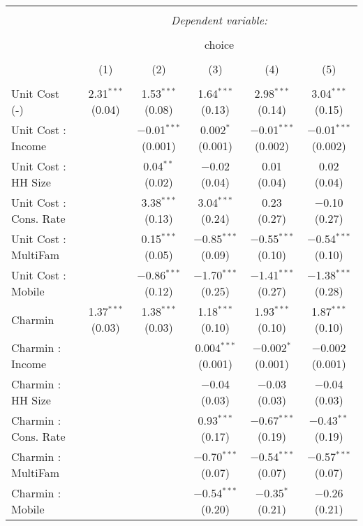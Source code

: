 
\begin{table}[!htbp] \centering 
  \caption{} 
  \label{tab:mnlBostonObsHet} 
\begin{tabular}{@{\extracolsep{5pt}}lccccc} 
\\[-1.8ex]\hline 
\hline \\[-1.8ex] 
 & \multicolumn{5}{c}{\textit{Dependent variable:}} \\ 
\cline{2-6} 
\\[-1.8ex] & \multicolumn{5}{c}{choice} \\ 
\\[-1.8ex] & (1) & (2) & (3) & (4) & (5)\\ 
\hline \\[-1.8ex] 
 Unit Cost (-) & 2.31$^{***}$ (0.04) & 1.53$^{***}$ (0.08) & 1.64$^{***}$ (0.13) & 2.98$^{***}$ (0.14) & 3.04$^{***}$ (0.15) \\ 
  Unit Cost : Income &  & $-$0.01$^{***}$ (0.001) & 0.002$^{*}$ (0.001) & $-$0.01$^{***}$ (0.002) & $-$0.01$^{***}$ (0.002) \\ 
  Unit Cost : HH Size &  & 0.04$^{**}$ (0.02) & $-$0.02 (0.04) & 0.01 (0.04) & 0.02 (0.04) \\ 
  Unit Cost : Cons. Rate &  & 3.38$^{***}$ (0.13) & 3.04$^{***}$ (0.24) & 0.23 (0.27) & $-$0.10 (0.27) \\ 
  Unit Cost : MultiFam &  & 0.15$^{***}$ (0.05) & $-$0.85$^{***}$ (0.09) & $-$0.55$^{***}$ (0.10) & $-$0.54$^{***}$ (0.10) \\ 
  Unit Cost : Mobile &  & $-$0.86$^{***}$ (0.12) & $-$1.70$^{***}$ (0.25) & $-$1.41$^{***}$ (0.27) & $-$1.38$^{***}$ (0.28) \\ 
  Charmin & 1.37$^{***}$ (0.03) & 1.38$^{***}$ (0.03) & 1.18$^{***}$ (0.10) & 1.93$^{***}$ (0.10) & 1.87$^{***}$ (0.10) \\ 
  Charmin : Income &  &  & 0.004$^{***}$ (0.001) & $-$0.002$^{*}$ (0.001) & $-$0.002 (0.001) \\ 
  Charmin : HH Size &  &  & $-$0.04 (0.03) & $-$0.03 (0.03) & $-$0.04 (0.03) \\ 
  Charmin : Cons. Rate &  &  & 0.93$^{***}$ (0.17) & $-$0.67$^{***}$ (0.19) & $-$0.43$^{**}$ (0.19) \\ 
  Charmin : MultiFam &  &  & $-$0.70$^{***}$ (0.07) & $-$0.54$^{***}$ (0.07) & $-$0.57$^{***}$ (0.07) \\ 
  Charmin : Mobile &  &  & $-$0.54$^{***}$ (0.20) & $-$0.35$^{*}$ (0.21) & $-$0.26 (0.21) \\ 

\end{tabular}
\end{table}
